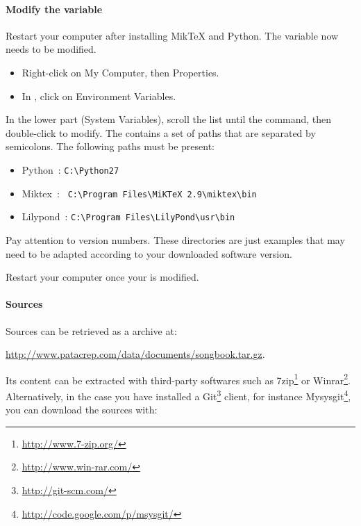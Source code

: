\paragraph{Modify the  variable}

Restart your computer after installing MikTeX and Python. The
 variable now needs to be modified.
\begin{itemize}
\item Right-click on My Computer, then Properties.
\item In , click on Environment
  Variables.
\end{itemize}

In the lower part (System Variables), scroll the list until the
 command, then double-click to modify. The 
contains a set of paths that are separated by semicolons. The
following paths must be present:
\begin{itemize}
\item Python~: \verb#C:\Python27#
\item Miktex~: \verb# C:\Program Files\MiKTeX 2.9\miktex\bin#
\item Lilypond~: \verb#C:\Program Files\LilyPond\usr\bin#
\end{itemize}

\begin{nota}
Pay attention to version numbers. These directories are just examples
that may need to be adapted according to your downloaded software
version.
\end{nota}

Restart your computer once your  is modified.

\paragraph{Sources}

Sources can be retrieved as a  archive at:
\begin{center}
\url{http://www.patacrep.com/data/documents/songbook.tar.gz}.
\end{center}

Its content can be extracted with third-party softwares such as
7zip\footnote{\url{http://www.7-zip.org/}} or
Winrar\footnote{\url{http://www.win-rar.com/}}. Alternatively, in the
case you have installed a Git\footnote{\url{http://git-scm.com/}}
client, for instance
Mysysgit\footnote{\url{http://code.google.com/p/msysgit/}}, you can
download the sources with:

